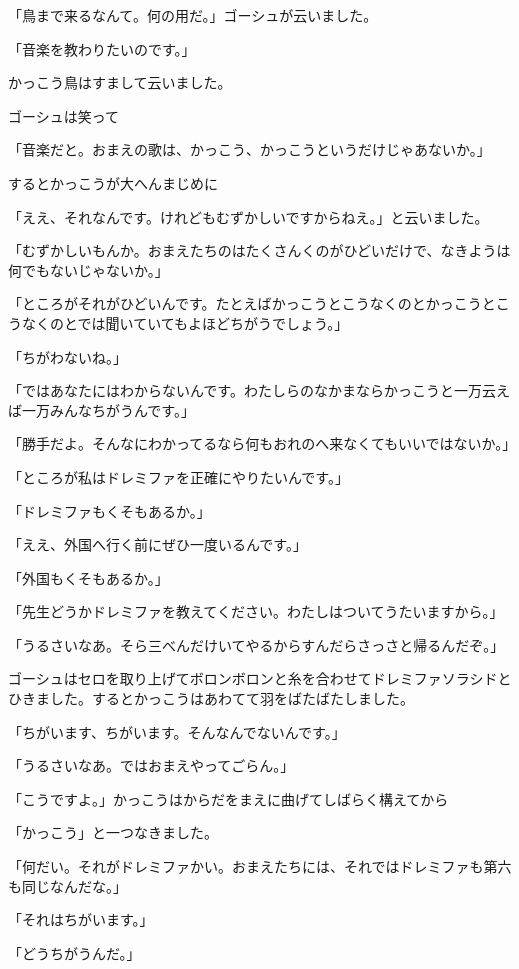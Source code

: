\documentclass[uplatex,a5paper,twoside]{jsarticle}
\begin{document}
「鳥まで来るなんて。何の用だ。」ゴーシュが云いました。

「音楽を教わりたいのです。」

かっこう鳥はすまして云いました。

ゴーシュは笑って

「音楽だと。おまえの歌は、かっこう、かっこうというだけじゃあないか。」

するとかっこうが大へんまじめに

「ええ、それなんです。けれどもむずかしいですからねえ。」と云いました。

「むずかしいもんか。おまえたちのはたくさんくのがひどいだけで、なきようは何でもないじゃないか。」

「ところがそれがひどいんです。たとえばかっこうとこうなくのとかっこうとこうなくのとでは聞いていてもよほどちがうでしょう。」

「ちがわないね。」

「ではあなたにはわからないんです。わたしらのなかまならかっこうと一万云えば一万みんなちがうんです。」

「勝手だよ。そんなにわかってるなら何もおれのへ来なくてもいいではないか。」

「ところが私はドレミファを正確にやりたいんです。」

「ドレミファもくそもあるか。」

「ええ、外国へ行く前にぜひ一度いるんです。」

「外国もくそもあるか。」

「先生どうかドレミファを教えてください。わたしはついてうたいますから。」

「うるさいなあ。そら三べんだけいてやるからすんだらさっさと帰るんだぞ。」

ゴーシュはセロを取り上げてボロンボロンと糸を合わせてドレミファソラシドとひきました。するとかっこうはあわてて羽をばたばたしました。

「ちがいます、ちがいます。そんなんでないんです。」

「うるさいなあ。ではおまえやってごらん。」

「こうですよ。」かっこうはからだをまえに曲げてしばらく構えてから

「かっこう」と一つなきました。

「何だい。それがドレミファかい。おまえたちには、それではドレミファも第六も同じなんだな。」

「それはちがいます。」

「どうちがうんだ。」
\end{document}
